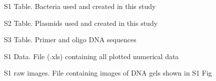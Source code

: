 S1 Table. Bacteria used and created in this study

S2 Table. Plasmids used and created in this study

S3 Table. Primer and oligo DNA sequences

S1 Data. File (.xls) containing all plotted numerical data

S1 raw images. File containing images of DNA gels shown in S1 Fig

{}

